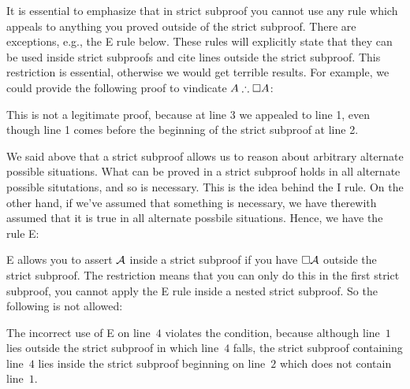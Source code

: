 It is essential to emphasize that in strict subproof you cannot use any rule which appeals to anything you proved outside of the strict subproof. There are exceptions, e.g., the \ebox E rule below. These rules will explicitly state that they can be used inside strict subproofs and cite lines outside the strict subproof. This restriction is essential, otherwise we would get terrible results. For example, we could provide the following proof to vindicate $A\therefore \ebox A$:
\begin{fitchproof}
		\PR
		\open
		\AS
		\close
\end{fitchproof}
This is not a legitimate proof, because at line 3 we appealed to line 1, even though line 1 comes before the beginning of the strict subproof at line 2.

We said above that a strict subproof allows us to reason about arbitrary alternate possible situations. What can be proved in a strict subproof holds in all alternate possible situtations, and so is necessary. This is the idea behind the \ebox I rule. On the other hand, if we've assumed that something is necessary, we have therewith assumed that it is true in all alternate possbile situations.  Hence, we have the rule \ebox E:

\ebox E allows you to assert $\mathcal{A}$ inside a strict subproof if you have $\Box \mathcal{A}$ outside the strict subproof. The restriction means that you can only do this in the first strict subproof, you cannot apply the \ebox E rule inside a nested strict subproof. So the following is not allowed:
\begin{fitchproof}
	\open
	\AS
	\open
	\AS
\close\close
\end{fitchproof}
The incorrect use of \ebox E on line~$4$ violates the condition, because although line~$1$ lies outside the strict subproof in which line~$4$ falls, the strict subproof containing line~$4$ lies inside the strict subproof beginning on line~$2$ which does not contain line~$1$.


